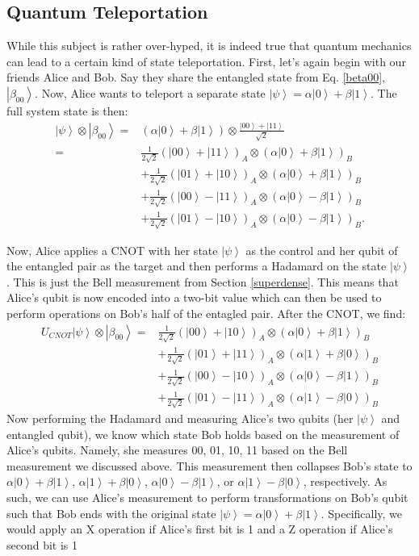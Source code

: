 \documentclass[11pt]{article} %
\newcommand{\ket}[1]{\left|#1\right\rangle}
\begin{document}
\subsection{Quantum Teleportation}
While this subject is rather over-hyped, it is indeed true that quantum mechanics can lead to a certain kind of state teleportation. First, let's again begin with our friends Alice and Bob. Say they share the entangled state from Eq. \ref{beta00}, $\ket{\beta_{00}}$. Now, Alice wants to teleport a separate state $\ket{\psi}=\alpha\ket{0}+\beta\ket{1}$. The full system state is then:
\begin{align}
    \ket{\psi}\otimes\ket{\beta_{00}} =&\left(\alpha\ket{0}+\beta\ket{1}\right)\otimes\frac{\ket{00}+\ket{11}}{\sqrt{2}}\\
    =&\frac{1}{2\sqrt{2}}(\ket{00}+\ket{11})_A\otimes\left(\alpha\ket{0}+\beta\ket{1}\right)_B\nonumber\\
    &+\frac{1}{2\sqrt{2}}(\ket{01}+\ket{10})_A\otimes\left(\alpha\ket{0}+\beta\ket{1}\right)_B\nonumber\\
    &+\frac{1}{2\sqrt{2}}(\ket{00}-\ket{11})_A\otimes\left(\alpha\ket{0}-\beta\ket{1}\right)_B\nonumber\\
    &+\frac{1}{2\sqrt{2}}(\ket{01}-\ket{10})_A\otimes\left(\alpha\ket{0}-\beta\ket{1}\right)_B.
\end{align}

Now, Alice applies a CNOT with her state $\ket{\psi}$ as the control and her qubit of the entangled pair as the target and then performs a Hadamard on the state $\ket{\psi}$. This is just the Bell measurement from Section \ref{superdense}. This means that Alice's qubit is now encoded into a two-bit value which can then be used to perform operations on Bob's half of the entagled pair. After the CNOT, we find:
\begin{align}
    U_{CNOT}\ket{\psi}\otimes\ket{\beta_{00}} 
    =&\frac{1}{2\sqrt{2}}(\ket{00}+\ket{10})_A\otimes\left(\alpha\ket{0}+\beta\ket{1}\right)_B\nonumber\\
    &+\frac{1}{2\sqrt{2}}(\ket{01}+\ket{11})_A\otimes\left(\alpha\ket{1}+\beta\ket{0}\right)_B\nonumber\\
    &+\frac{1}{2\sqrt{2}}(\ket{00}-\ket{10})_A\otimes\left(\alpha\ket{0}-\beta\ket{1}\right)_B\nonumber\\
    &+\frac{1}{2\sqrt{2}}(\ket{01}-\ket{11})_A\otimes\left(\alpha\ket{1}-\beta\ket{0}\right)_B
\end{align}
Now performing the Hadamard and measuring Alice's two qubits (her $\ket{\psi}$ and entangled qubit), we know which state Bob holds based on the measurement of Alice's qubits. Namely, she measures 00, 01, 10, 11 based on the Bell measurement we discussed above. This measurement then collapses Bob's state to $\alpha\ket{0}+\beta\ket{1}$, $\alpha\ket{1}+\beta\ket{0}$, $\alpha\ket{0}-\beta\ket{1}$, or $\alpha\ket{1}-\beta\ket{0}$, respectively. As such, we can use Alice's measurement to perform transformations on Bob's qubit such that Bob ends with the original state $\ket{\psi}=\alpha\ket{0}+\beta\ket{1}$. Specifically, we would apply an X operation if Alice's first bit is 1 and a Z operation if Alice's second bit is 1
\end{document}
